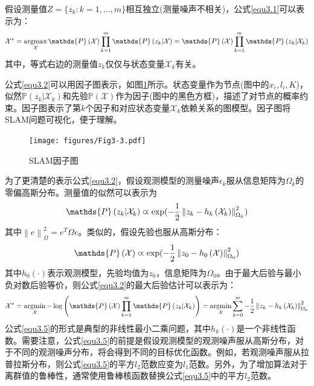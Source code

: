 假设测量值$Z=\lbrace z_k:k=1,\ldots ,m\rbrace$相互独立(测量噪声不相关)，公式\eqref{equ3.1}可以表示为：
\begin{equation}
\label{equ3.2}
\mathcal{X}^* 
= 
\argmax \limits_{\mathcal{X}} \mathds{P}\left(\mathcal{X}\right) \prod \limits_{k=1}^{m} \mathds{P}\left(z_k \vert \mathcal{X}  \right)
=
\mathds{P}\left(\mathcal{X}\right) \prod \limits_{k=1}^{m} \mathds{P}\left(z_k \vert \mathcal{X}_k  \right)
\end{equation}
其中，等式右边的测量值$z_k$仅仅与状态变量$\mathcal{X}_k$有关。

公式\eqref{equ3.2}可以用因子图\upcite{[3.3]}表示，如图\ref{fig3.3}所示。状态变量作为节点(图中的$x_i,l_i,K$)，似然$\mathds{P}\left(z_k \vert \mathcal{X}_k  \right)$和先验$\mathds{P}\left(\mathcal{X} \right)$作为因子(图中的黑色方框)，描述了对节点的概率约束。因子图表示了第$k$个因子和对应状态变量$\mathcal{X}_k$依赖关系的图模型。因子图将SLAM问题可视化，便于理解。

\begin{figure}[h]
\centering
\texttt{[image: figures/Fig3-3.pdf]}
\caption{SLAM因子图}
\label{fig3.3}
\end{figure}
\vspace{-20pt}

为了更清楚的表示公式\eqref{equ3.2}，假设观测模型的测量噪声$\epsilon_k$服从信息矩阵为$\Omega_k$的零偏高斯分布。测量值的似然可以表示为
\begin{equation}
\label{equ3.3}
\mathds{P}\left(z_k \vert \mathcal{X}_k  \right) \varpropto \exp ( -{1 \over 2} \left\| z_k -  h_k\left( \mathcal{X}_k \right) \right\|_{\Omega_k}^2 )
\end{equation}
其中$\left\| e \right\|_{\Omega}^2 = e^T \Omega e$。类似的，假设先验也服从高斯分布：
\begin{equation}
\label{equ3.4}
\mathds{P}\left( \mathcal{X}  \right) \varpropto \exp ( -{1 \over 2} \left\| z_0 - h_0\left(  \mathcal{X} \right)  \right\|_{\Omega_0}^2 )
\end{equation}
其中$h_0(\cdot)$表示观测模型，先验均值为$z_0$，信息矩阵为$\Omega_0$。由于最大后验与最小负对数后验等价，则公式\eqref{equ3.2}的最大后验估计可以表示为：
\begin{equation}
\label{equ3.5}
\mathcal{X}^* 
=
\argmin \limits_{\mathcal{X}} - \log \left( \mathds{P}\left(\mathcal{X}\right) \prod \limits_{k=1}^{m} \mathds{P}\left(z_k \vert \mathcal{X}_k  \right) \right)
=
\argmin \limits_{\mathcal{X}} \sum \limits_{k=0}^{m} -{1 \over 2} \left\|  z_k - h_k\left(   \mathcal{X}_k \right)  \right\|_{\Omega_k}^2
\end{equation}
公式\eqref{equ3.5}的形式是典型的非线性最小二乘问题，其中$h_k(\cdot)$是一个非线性函数。需要注意，公式\eqref{equ3.5}的前提是假设观测模型的观测噪声服从高斯分布，对于不同的观测噪声分布，将会得到不同的目标优化函数。例如，若观测噪声服从拉普拉斯分布，则公式\eqref{equ3.5}的平方$l_2$范数应变为$l_1$范数。另外，为了增加算法对于离群值的鲁棒性，通常使用鲁棒核函数\upcite{[3.4]}替换公式\eqref{equ3.5}中的平方$l_2$范数。

